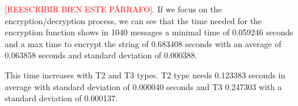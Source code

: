 \documentclass[journal,twoside]{JoPhA}
\begin{document}
\textcolor{red}{[REESCRIBIR BIEN ESTE P\'ARRAFO].} If we focus on the encryption/decryption process, we can see that the time needed for the encryption function shows in 1040 messages a minimal time of 0.059246 seconds and a max time to encrypt the string of 0.683408 seconds with an average of 0.063858 seconds and standard deviation of 0.000388.

This time increases with T2 and T3 types. T2 type needs 0.123383 seconds in average with standard deviation of 0.000040 seconds and  T3  0.247303 with a standard deviation of 0.000137.






% 
% 
\end{document}
